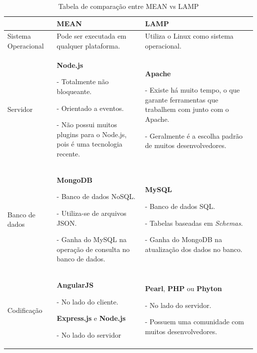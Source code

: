 \begin{table}[ht]
\centering
\begin{tabular}{|p{4cm}|p{5cm}|p{5cm}|}
\hline
\rowcolor[HTML]{CFCFCF} 
    & MEAN                                                                                                                   & LAMP                                                                                                                   \\ \hline
    Sistema Operacional & Pode ser executada em qualquer plataforma. & Utiliza o Linux como sistema operacional. \\ \hline
    Servidor 
    
    & \textbf{Node.js} 
    
    - Totalmente não bloqueante. 
    
    - Orientado a eventos. 
    
    - Não possui muitos plugins para o Node.js, pois é uma tecnologia recente. 
    
    & \textbf{Apache}
    
    - Existe há muito tempo, o que garante ferramentas que trabalhem com junto com o Apache. 
    
    - Geralmente é a escolha padrão de muitos desenvolvedores. \\ \hline
    Banco de dados & \textbf{MongoDB} 
    
    - Banco de dados NoSQL. 
    
    - Utiliza-se de arquivos JSON. 
    
    - Ganha do MySQL na operação de consulta no banco de dados. 
    
    & \textbf{MySQL} 
    
    - Banco de dados SQL. 
    
    - Tabelas baseadas em \textit{Schemas}. 
    
    - Ganha do MongoDB na atualização dos dados no banco. \\ \hline
    
    Codificação & \textbf{AngularJS}
    
    - No lado do cliente. 
   
    \textbf{Express.js} e \textbf{Node.js} 
    
    - No lado do servidor & \textbf{Pearl}, \textbf{PHP} ou \textbf{Phyton} 
    
    - No lado do servidor.  
    
    - Possuem uma comunidade com muitos desenvolvedores.  \\ \hline
\end{tabular}
\caption{Tabela de comparação entre MEAN vs LAMP}
\label{fig:tabela mean vs lamp}
\end{table}

